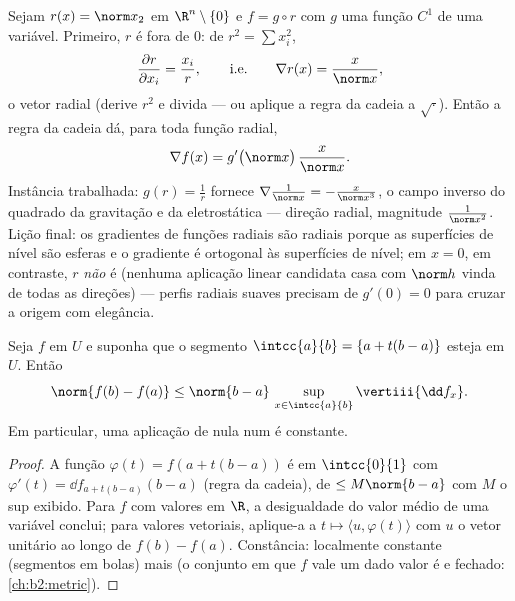 \begin{example}\label{ex:b2:diffcalc:radial}
Sejam $r(x) = \norm x_2$ em $\R^n\setminus\{0\}$ e $f = g \circ
r$ com $g$ uma função $C^1$ de uma variável. Primeiro, $r$ é
 fora de $0$: de $r^2 = \sum x_i^2$,
\[
\frac{\partial r}{\partial x_i} = \frac{x_i}{r},
\qquad\text{i.e.}\qquad
\nabla r(x) = \frac{x}{\norm x} ,
\]
o vetor radial  (derive $r^2$ e divida --- ou
aplique a regra da cadeia a $\sqrt{\cdot}$). Então a regra da cadeia
dá, para toda função radial,
\[
\nabla f(x) = g'\bigl(\norm x\bigr)\,\frac{x}{\norm x} .
\]
Instância trabalhada: $g(r) = \frac1r$ fornece $\nabla\frac{1}{\norm
x} = -\frac{x}{\norm x^3}$, o campo inverso do quadrado da
gravitação e da eletrostática --- direção radial, magnitude
$\frac{1}{\norm x^2}$. Lição final: os gradientes de funções radiais
são radiais porque as superfícies de nível são esferas e
o gradiente é ortogonal às superfícies de nível; em $x = 0$, em
contraste, $r$ \emph{não} é  (nenhuma aplicação
linear candidata casa com $\norm h$ vinda de todas as direções) --- perfis
radiais suaves precisam de $g'(0) = 0$ para cruzar a origem
com elegância.
\end{example}

\begin{theorem}\label{thm:b2:diffcalc:mvi}
Seja $f$  em $U$ e suponha que o segmento $\intcc{a}{b}
= \{a + t(b-a)\}$ esteja em $U$. Então
\[
\norm{f(b) - f(a)} \leq \norm{b - a}\,
\sup_{x \in \intcc{a}{b}} \vertiii{\dd f_x} .
\]
Em particular, uma aplicação  de  nula num
 \emph{} é constante.
\end{theorem}

\begin{proof}
A função $\varphi(t) = f(a + t(b-a))$ é  em
$\intcc{0}{1}$ com $\varphi'(t) = \dd f_{a + t(b-a)}(b - a)$
(regra da cadeia), de  $\leq M\norm{b-a}$ com $M$ o sup
exibido. Para $f$ com valores em $\R$, a desigualdade do valor médio de uma variável
conclui; para valores vetoriais, aplique-a a $t \mapsto \langle u,
\varphi(t)\rangle$ com $u$ o vetor unitário ao longo de $f(b) - f(a)$.
Constância: localmente constante (segmentos em bolas) mais 
(o conjunto em que $f$ vale um dado valor é  e fechado:
\cref{ch:b2:metric}).
\end{proof}

